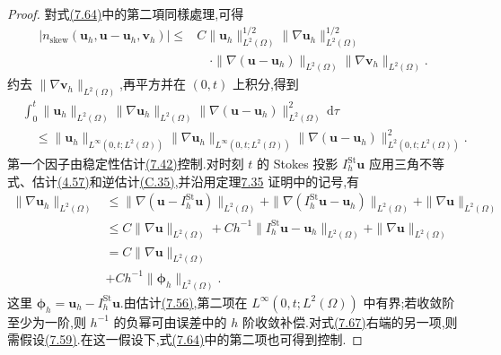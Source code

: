 \begin{proof}
對式\hyperref[eq:time-dependent-pressure-error-convection-splitting]{(7.64)}中的第二項同樣處理,可得
\begin{equation}\label{eq:time-dependent-pressure-error-convection-bound-2}
\begin{aligned}
  |n_{\mathrm{skew}}(\bm{u}_h,\bm{u}-\bm{u}_h,\bm{v}_h)|
  \le{}&C\|\bm{u}_h\|_{L^2(\Omega)}^{1/2}
       \|\nabla\bm{u}_h\|_{L^2(\Omega)}^{1/2}\\
  &\quad\cdot\|\nabla(\bm{u}-\bm{u}_h)\|_{L^2(\Omega)}
       \|\nabla\bm{v}_h\|_{L^2(\Omega)}.
\end{aligned}
\end{equation}
约去 $\|\nabla\bm{v}_h\|_{L^2(\Omega)}$,再平方并在 $(0,t)$ 上积分,得到
\[
\begin{aligned}
  &\int_0^t
       \|\bm{u}_h\|_{L^2(\Omega)}
       \|\nabla\bm{u}_h\|_{L^2(\Omega)}
       \|\nabla(\bm{u}-\bm{u}_h)\|_{L^2(\Omega)}^2\,\mathrm{d}\tau\\
  &\quad\le
       \|\bm{u}_h\|_{L^\infty(0,t;L^2(\Omega))}
       \|\nabla\bm{u}_h\|_{L^\infty(0,t;L^2(\Omega))}
       \|\nabla(\bm{u}-\bm{u}_h)\|_{L^2(0,t;L^2(\Omega))}^2.
\end{aligned}
\]
第一个因子由稳定性估计\hyperref[eq:time-dependent-fem-velocity-stability]{(7.42)}控制.对时刻 $t$ 的 Stokes 投影 $I_h^{\mathrm{St}}\bm{u}$ 应用三角不等式、估计\hyperref[eq:stokes-projection-best-approximation-velocity]{(4.57)}和逆估计\hyperref[eq:appendix-c-35]{(C.35)},并沿用定理\hyperref[thm:time-dependent-fem-velocity-error]{7.35} 证明中的记号,有
\begin{equation}\label{eq:time-dependent-pressure-error-discrete-gradient-bound}
\begin{aligned}
  \|\nabla\bm{u}_h\|_{L^2(\Omega)}
  &\le \|\nabla(\bm{u}-I_h^{\mathrm{St}}\bm{u})\|_{L^2(\Omega)}
       +\|\nabla(I_h^{\mathrm{St}}\bm{u}-\bm{u}_h)\|_{L^2(\Omega)}
       +\|\nabla\bm{u}\|_{L^2(\Omega)}\\
  &\le C\|\nabla\bm{u}\|_{L^2(\Omega)}
       +Ch^{-1}\|I_h^{\mathrm{St}}\bm{u}-\bm{u}_h\|_{L^2(\Omega)}
       +\|\nabla\bm{u}\|_{L^2(\Omega)}\\
  &=C\|\nabla\bm{u}\|_{L^2(\Omega)}\\
  &+Ch^{-1}\|\symbf{\phi}_h\|_{L^2(\Omega)}.
\end{aligned}
\end{equation}
这里 $\symbf{\phi}_h=\bm{u}_h-I_h^{\mathrm{St}}\bm{u}$.由估计\hyperref[eq:time-dependent-fem-error-gronwall]{(7.56)},第二项在 $L^\infty(0,t;L^2(\Omega))$ 中有界;若收敛阶至少为一阶,则 $h^{-1}$ 的负幂可由误差中的 $h$ 阶收敛补偿.对式\hyperref[eq:time-dependent-pressure-error-discrete-gradient-bound]{(7.67)}右端的另一项,则需假设\hyperref[eq:time-dependent-fem-pressure-gradient-regularity]{(7.59)}.在这一假设下,式\hyperref[eq:time-dependent-pressure-error-convection-splitting]{(7.64)}中的第二项也可得到控制.


\end{proof}

